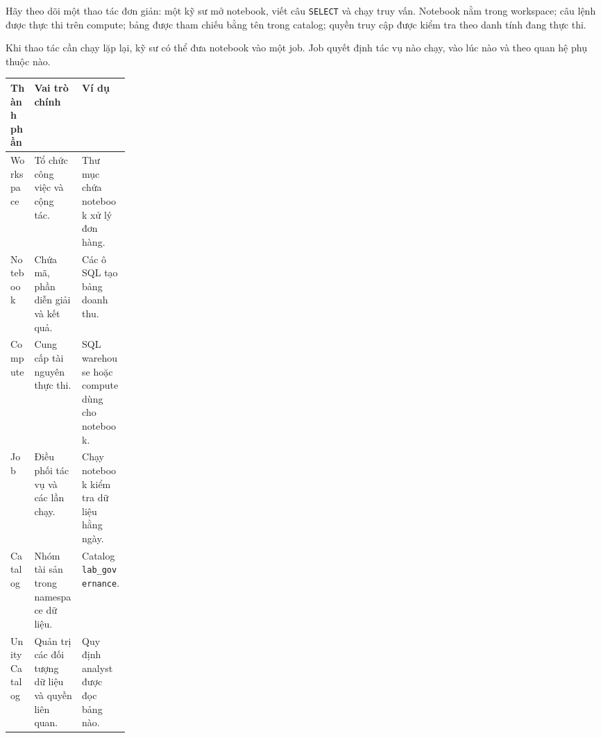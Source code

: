 Hãy theo dõi một thao tác đơn giản: một kỹ sư mở notebook, viết câu \texttt{SELECT} và chạy truy vấn. Notebook nằm trong workspace; câu lệnh được thực thi trên compute; bảng được tham chiếu bằng tên trong catalog; quyền truy cập được kiểm tra theo danh tính đang thực thi.


Khi thao tác cần chạy lặp lại, kỹ sư có thể đưa notebook vào một job. Job quyết định tác vụ nào chạy, vào lúc nào và theo quan hệ phụ thuộc nào.


\begin{figure}[!htbp]
\centering
{}
\begin{figurecardcaptionaivn}
\end{figurecardcaptionaivn}
\end{figure}


\begin{table}[H]
\small
\renewcommand{\arraystretch}{1.25}
\begin{tabularx}{\linewidth}{@{}p{0.20\linewidth}YY@{}}
\toprule
{}
\textbf{Thành phần} & \textbf{Vai trò chính} & \textbf{Ví dụ} \\
\midrule
Workspace & Tổ chức công việc và cộng tác. & Thư mục chứa notebook xử lý đơn hàng. \\
Notebook & Chứa mã, phần diễn giải và kết quả. & Các ô SQL tạo bảng doanh thu. \\
Compute & Cung cấp tài nguyên thực thi. & SQL warehouse hoặc compute dùng cho notebook. \\
Job & Điều phối tác vụ và các lần chạy. & Chạy notebook kiểm tra dữ liệu hằng ngày. \\
Catalog & Nhóm tài sản trong namespace dữ liệu. & Catalog \texttt{lab\_\allowbreak{}governance}. \\
Unity Catalog & Quản trị các đối tượng dữ liệu và quyền liên quan. & Quy định analyst được đọc bảng nào. \\
\bottomrule
\end{tabularx}
\end{table}


